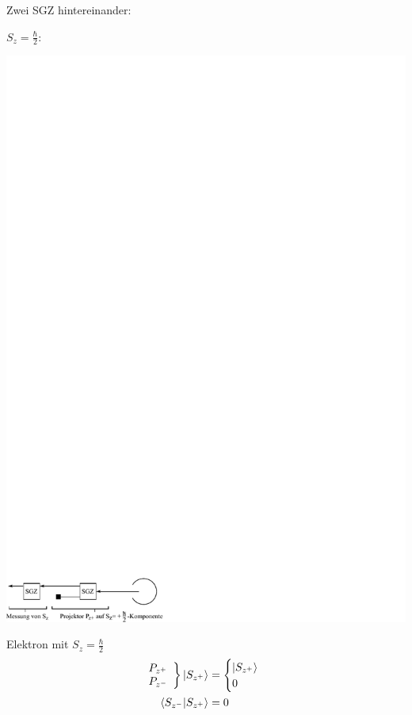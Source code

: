 \documentclass[a4paper]{scrartcl}
\begin{document}
{Zwei SGZ hintereinander:
\begin{aaufz}
\item $S_z = \frac \hbar 2$:
\begin{center}
\includegraphics{057SGZ2}
\end{center}
Elektron mit $S_z = \frac \hbar 2$
\begin{align*}
\left. \begin{array}{l} P_{z^+} \\ P_{z^-} \end{array} \right\} \ket{ S_{z^+} } & = \begin{cases} \ket{S_{z^+}} \\ 0 \end{cases} \\
\braket{ S_{z^-} | S_{z^+} } & = 0
\end{align*}


\end{aaufz}}
\end{document}
